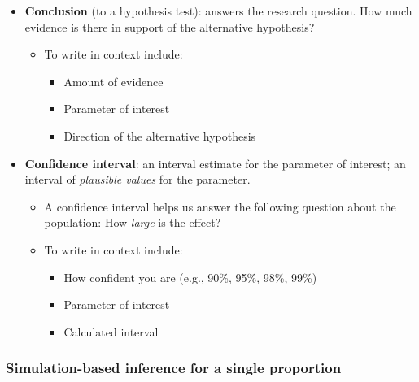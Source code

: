\documentclass[
]{report}
\begin{document}
\begin{itemize}
\item
  \textbf{Conclusion} (to a hypothesis test): answers the research question. How much evidence is there in support of the alternative hypothesis?

  \begin{itemize}
  \item
    To write in context include:

    \begin{itemize}
    \item
      Amount of evidence
    \item
      Parameter of interest
    \item
      Direction of the alternative hypothesis
    \end{itemize}
  \end{itemize}
\item
  \textbf{Confidence interval}: an interval estimate for the parameter of interest; an interval of \emph{plausible values} for the parameter.

  \begin{itemize}
  \item
    A confidence interval helps us answer the following question about the population: How \emph{large} is the effect?
  \item
    To write in context include:

    \begin{itemize}
    \item
      How confident you are (e.g., 90\%, 95\%, 98\%, 99\%)
    \item
      Parameter of interest
    \item
      Calculated interval
    \end{itemize}
  \end{itemize}
\end{itemize}

\subsubsection*{Simulation-based inference for a single proportion}\label{simulation-based-inference-for-a-single-proportion}
\end{document}
